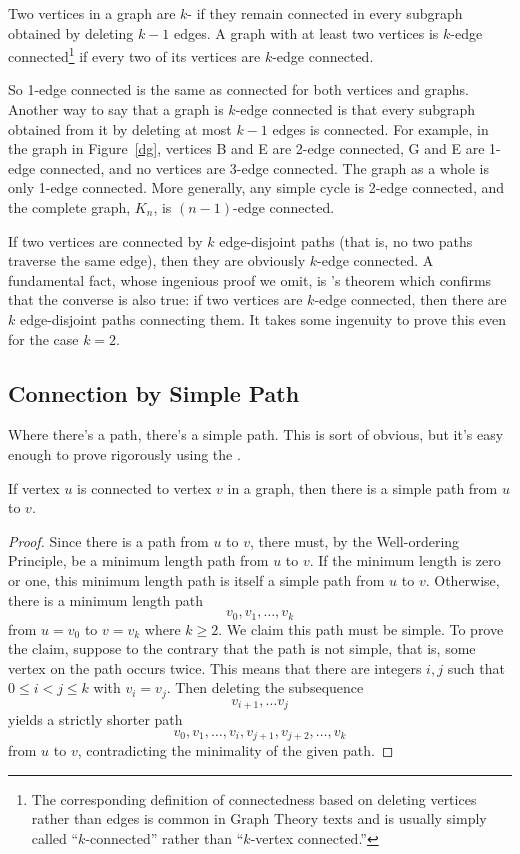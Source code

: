\begin{definition}
  Two vertices in a graph are $k$- if they remain
  connected in every subgraph obtained by deleting $k-1$ edges.  A graph
  with at least two vertices is $k$-edge connected\footnote{The
    corresponding definition of connectedness based on deleting vertices
    rather than edges is common in Graph Theory texts and is usually
    simply called ``$k$-connected'' rather than ``$k$-vertex connected.''}
  if every two of its vertices are $k$-edge connected.
\end{definition}

So 1-edge connected is the same as connected for both vertices and graphs.
Another way to say that a graph is $k$-edge connected is that every
subgraph obtained from it by deleting at most $k-1$ edges is connected.
For example, in the graph in Figure~\ref{dg}, vertices B and E are 2-edge
connected, G and E are 1-edge connected, and no vertices are 3-edge
connected.  The graph as a whole is only 1-edge connected.  More
generally, any simple cycle is 2-edge connected, and the complete graph,
$K_n$, is $(n-1)$-edge connected.

If two vertices are connected by $k$ edge-disjoint paths (that is, no two
paths traverse the same edge), then they are obviously $k$-edge connected.
A fundamental fact, whose ingenious proof we omit, is 's
theorem which confirms that the converse is also true: if two vertices are
$k$-edge connected, then there are $k$ edge-disjoint paths connecting
them.  It takes some ingenuity to prove this even for the case $k=2$.

\subsection{Connection by Simple Path}

Where there's a path, there's a simple path.  This is sort of obvious, but
it's easy enough to prove rigorously using the .

\begin{lemma}\label{simplepath}
If vertex $u$ is connected to vertex $v$ in a graph, then there is a
simple path from $u$ to $v$.
\end{lemma}

\begin{proof}
Since there is a path from $u$ to $v$, there must, by the Well-ordering
Principle, be a minimum length path from $u$ to $v$.  If the minimum
length is zero or one, this minimum length path is itself a simple path
from $u$ to $v$.
Otherwise, there is a minimum length path
\[
v_0, v_1,\dots, v_k
\]
from $u = v_0$ to $v = v_k$ where $k \geq 2$.  We claim this path must be
simple.
To prove the claim, suppose to the contrary that the path is not simple,
that is, some vertex on the path occurs twice.  This means that there are
integers $i,j$ such that $0 \leq i < j \leq k$ with $v_i= v_j$.  Then
deleting the subsequence
\[
v_{i+1}, \dots v_j
\]
yields a strictly shorter path
\[
v_0, v_1,\dots, v_i,v_{j+1},v_{j+2},\dots, v_k
\]
from $u$ to $v$, contradicting the minimality of the given path.
\end{proof}

